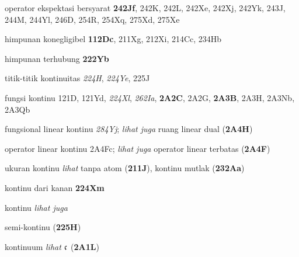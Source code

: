 operator ekspektasi bersyarat {\bf 242Jf}, 242K, 242L, 242Xe, 242Xj, 242Yk, 243J, 244M, 244Yl, 246D, 254R, 254Xq, 275Xd, 275Xe










 himpunan konegligibel {\bf 112Dc}, 211Xg, 212Xi, 214Cc, 234Hb

 himpunan terhubung {\bf 222Yb}































 titik-titik kontinuitas {\it 224H}, {\it 224Ye}, 225J


 fungsi kontinu 121D, 121Yd, {\it 224Xl}, {\it 262Ia}, {\bf 2A2C}, 2A2G, {\bf 2A3B}, 2A3H, 2A3Nb, 2A3Qb





fungsional linear kontinu {\it 284Yj}; {\it lihat juga} ruang linear dual ({\bf 2A4H})


operator linear kontinu 2A4Fc; {\it lihat juga} operator linear terbatas ({\bf 2A4F})


ukuran kontinu {\it lihat} tanpa atom ({\bf 211J}), kontinu mutlak ({\bf 232Aa})


kontinu dari kanan {\bf 224Xm}





kontinu {\it lihat juga }

semi-{\vthsp}kontinu ({\bf 225H})



 kontinuum {\it lihat} $\frak c$ ({\bf 2A1L})









